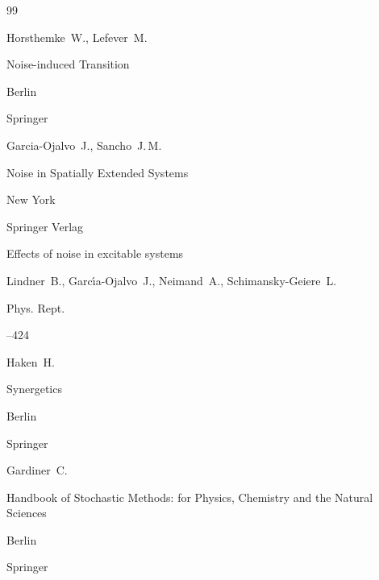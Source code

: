 \begin{thebibliography}{99}




\by Horsthemke~W., Lefever~M.

\book Noise-induced Transition

\publaddr Berlin

\publ Springer






\by Garcia-Ojalvo~J., Sancho~J.\,M.

\book Noise in Spatially Extended Systems

\publaddr New York

\publ Springer Verlag






\paper Effects of noise in excitable systems

\by  Lindner~B., Garc\'\i a-Ojalvo~J.,  Neimand~A., Schimansky-Geiere~L.

\jour Phys. Rept.




--424




\by Haken~H.

\book Synergetics

\publaddr Berlin

\publ Springer






\by Gardiner~C.

\book  Handbook of Stochastic Methods: for Physics, Chemistry and the Natural Sciences

\publaddr Berlin

\publ Springer








\end{thebibliography}
